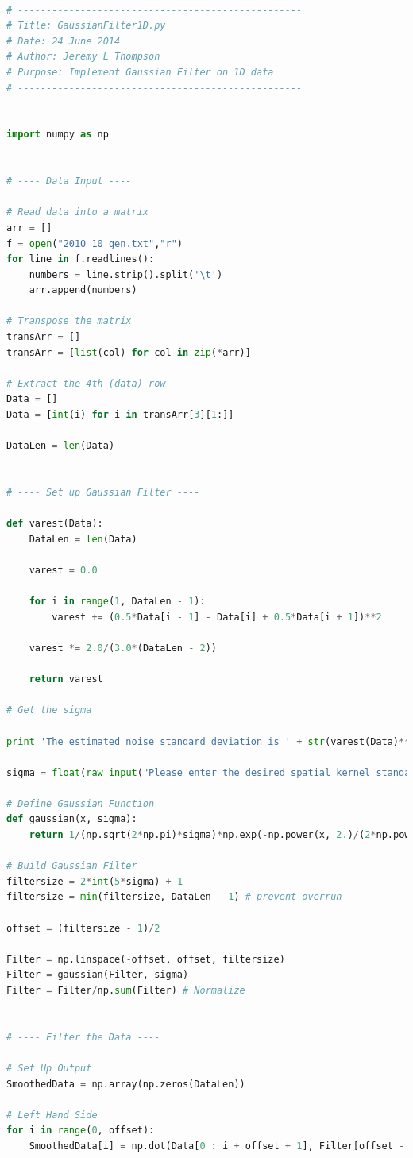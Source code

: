 \documentclass[11pt]{article}
\theoremstyle{definition}
\begin{document}
\begin{lstlisting}[language = Python]

# --------------------------------------------------
# Title: GaussianFilter1D.py
# Date: 24 June 2014
# Author: Jeremy L Thompson
# Purpose: Implement Gaussian Filter on 1D data
# --------------------------------------------------


import numpy as np


# ---- Data Input ----

# Read data into a matrix
arr = []
f = open("2010_10_gen.txt","r")
for line in f.readlines():
    numbers = line.strip().split('\t')
    arr.append(numbers)

# Transpose the matrix
transArr = []
transArr = [list(col) for col in zip(*arr)]

# Extract the 4th (data) row
Data = []
Data = [int(i) for i in transArr[3][1:]]

DataLen = len(Data)


# ---- Set up Gaussian Filter ----

def varest(Data):
    DataLen = len(Data)

    varest = 0.0

    for i in range(1, DataLen - 1):
        varest += (0.5*Data[i - 1] - Data[i] + 0.5*Data[i + 1])**2

    varest *= 2.0/(3.0*(DataLen - 2))

    return varest

# Get the sigma

print 'The estimated noise standard deviation is ' + str(varest(Data)**(1/2))

sigma = float(raw_input("Please enter the desired spatial kernel standard deviation: "))

# Define Gaussian Function
def gaussian(x, sigma):
    return 1/(np.sqrt(2*np.pi)*sigma)*np.exp(-np.power(x, 2.)/(2*np.power(sigma, 2.)))

# Build Gaussian Filter
filtersize = 2*int(5*sigma) + 1
filtersize = min(filtersize, DataLen - 1) # prevent overrun

offset = (filtersize - 1)/2

Filter = np.linspace(-offset, offset, filtersize)
Filter = gaussian(Filter, sigma)
Filter = Filter/np.sum(Filter) # Normalize


# ---- Filter the Data ----

# Set Up Output
SmoothedData = np.array(np.zeros(DataLen))

# Left Hand Side
for i in range(0, offset):
    SmoothedData[i] = np.dot(Data[0 : i + offset + 1], Filter[offset - i : filtersize]/np.sum(Filter[offset - i : filtersize]))


\end{lstlisting}
\end{document}
